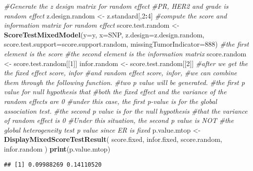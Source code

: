 \documentclass[11pt,]{article}
\newenvironment{Shaded}{\begin{snugshade}}{\end{snugshade}}
\newcommand{\CommentTok}[1]{\textcolor[rgb]{0.56,0.35,0.01}{\textit{#1}}}
\newcommand{\DataTypeTok}[1]{\textcolor[rgb]{0.13,0.29,0.53}{#1}}
\newcommand{\DecValTok}[1]{\textcolor[rgb]{0.00,0.00,0.81}{#1}}
\newcommand{\KeywordTok}[1]{\textcolor[rgb]{0.13,0.29,0.53}{\textbf{#1}}}
\newcommand{\NormalTok}[1]{#1}
\newcommand{\OperatorTok}[1]{\textcolor[rgb]{0.81,0.36,0.00}{\textbf{#1}}}
\newcommand{\StringTok}[1]{\textcolor[rgb]{0.31,0.60,0.02}{#1}}
\begin{document}
\begin{Shaded}
\begin{Highlighting}[]
\CommentTok{#Generate the z design matrix for random effect}
\CommentTok{#PR, HER2 and grade is random effect}
\NormalTok{z.design.random <-}\StringTok{ }\NormalTok{z.standard[,}\DecValTok{2}\OperatorTok{:}\DecValTok{4}\NormalTok{]}
\CommentTok{#compute the score and information matrix for random effect}
\NormalTok{score.test.random <-}\StringTok{ }\KeywordTok{ScoreTestMixedModel}\NormalTok{(}\DataTypeTok{y=}\NormalTok{y,}
                                         \DataTypeTok{x=}\NormalTok{SNP,}
                                         \DataTypeTok{z.design=}\NormalTok{z.design.random,}
                                         \DataTypeTok{score.test.support=}\NormalTok{score.support.random,}
                                         \DataTypeTok{missingTumorIndicator=}\DecValTok{888}\NormalTok{)}
\CommentTok{#the first element is the score}
\CommentTok{#the second element is the information matrix}
\NormalTok{score.random <-}\StringTok{ }\NormalTok{score.test.random[[}\DecValTok{1}\NormalTok{]]}
\NormalTok{infor.random <-}\StringTok{ }\NormalTok{score.test.random[[}\DecValTok{2}\NormalTok{]]}
\CommentTok{#after we get the the fixed effect score, infor }
\CommentTok{#and random effect score, infor, }
\CommentTok{#we can combine them through the following function. }
\CommentTok{#two p value will be generated.}
\CommentTok{#the first p value for null hypothesis that}
\CommentTok{#both the fixed effect and the variance of the random effects are 0}
\CommentTok{#under this case, the first p-value is for the global association test.}
\CommentTok{#the second p value is for the null hypothesis }
\CommentTok{#that the variance of random effect is 0}
\CommentTok{#Under this situation, the second p value is NOT }
\CommentTok{#the global heterogeneity test p value since ER is fixed}
\NormalTok{p.value.mtop <-}\StringTok{ }\KeywordTok{DisplayMixedScoreTestResult}\NormalTok{(}
\NormalTok{  score.fixed,}
\NormalTok{  infor.fixed,}
\NormalTok{  score.random,}
\NormalTok{  infor.random}
\NormalTok{)  }
\KeywordTok{print}\NormalTok{(p.value.mtop)}
\end{Highlighting}
\end{Shaded}

\begin{verbatim}
## [1] 0.09988269 0.14110520
\end{verbatim}
\end{document}
